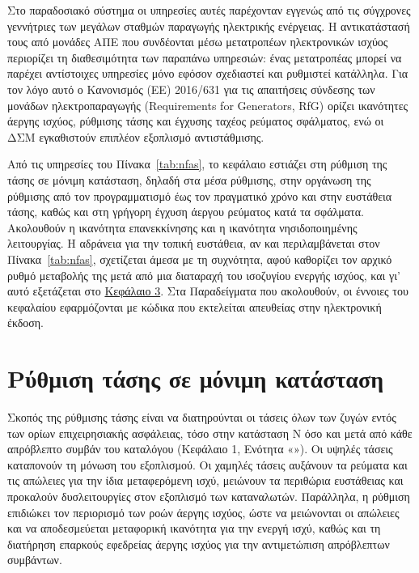 Στο παραδοσιακό σύστημα οι υπηρεσίες αυτές παρέχονταν εγγενώς από τις σύγχρονες γεννήτριες
των μεγάλων σταθμών παραγωγής ηλεκτρικής ενέργειας. Η αντικατάστασή τους από μονάδες ΑΠΕ που συνδέονται μέσω
μετατροπέων ηλεκτρονικών ισχύος περιορίζει τη διαθεσιμότητα των παραπάνω υπηρεσιών: ένας μετατροπέας μπορεί να παρέχει αντίστοιχες
υπηρεσίες μόνο εφόσον σχεδιαστεί και ρυθμιστεί κατάλληλα. Για τον λόγο αυτό ο Κανονισμός (ΕΕ) 2016/631 για τις απαιτήσεις σύνδεσης
των μονάδων ηλεκτροπαραγωγής (Requirements for Generators, RfG) ορίζει ικανότητες άεργης
ισχύος, ρύθμισης τάσης και έγχυσης ταχέος ρεύματος σφάλματος, ενώ οι ΔΣΜ εγκαθιστούν
επιπλέον εξοπλισμό αντιστάθμισης.

Από τις υπηρεσίες του Πίνακα~\ref{tab:nfas}, το κεφάλαιο εστιάζει στη ρύθμιση της τάσης σε
μόνιμη κατάσταση, δηλαδή στα μέσα ρύθμισης, στην οργάνωση της ρύθμισης από τον προγραμματισμό
έως τον πραγματικό χρόνο και στην ευστάθεια τάσης, καθώς και στη γρήγορη έγχυση άεργου ρεύματος
κατά τα σφάλματα. Ακολουθούν η ικανότητα επανεκκίνησης και η ικανότητα νησιδοποιημένης
λειτουργίας. Η
αδράνεια για την τοπική ευστάθεια, αν και περιλαμβάνεται στον Πίνακα~\ref{tab:nfas}, σχετίζεται
άμεσα με τη συχνότητα, αφού καθορίζει τον αρχικό ρυθμό μεταβολής της μετά από μια διαταραχή του
ισοζυγίου ενεργής ισχύος, και γι' αυτό εξετάζεται στο \hyperref[kef-03-theoria]{Κεφάλαιο 3}.
Στα Παραδείγματα που ακολουθούν, οι έννοιες του κεφαλαίου εφαρμόζονται με κώδικα που εκτελείται
απευθείας στην ηλεκτρονική έκδοση.

\section{Ρύθμιση τάσης σε μόνιμη κατάσταση}
\label{sec:v-control}

Σκοπός της ρύθμισης τάσης είναι να διατηρούνται οι τάσεις όλων των ζυγών εντός των ορίων
επιχειρησιακής ασφάλειας, τόσο στην κατάσταση N όσο και μετά από κάθε απρόβλεπτο συμβάν του
καταλόγου (Κεφάλαιο 1, Ενότητα «»). Οι υψηλές τάσεις καταπονούν τη μόνωση του
εξοπλισμού. Οι χαμηλές τάσεις αυξάνουν τα ρεύματα και τις απώλειες για την ίδια μεταφερόμενη
ισχύ, μειώνουν τα περιθώρια ευστάθειας και προκαλούν δυσλειτουργίες στον εξοπλισμό των
καταναλωτών. Παράλληλα, η ρύθμιση επιδιώκει τον περιορισμό των ροών άεργης ισχύος, ώστε να
μειώνονται οι απώλειες και να αποδεσμεύεται μεταφορική ικανότητα για την ενεργή ισχύ, καθώς
και τη διατήρηση επαρκούς εφεδρείας άεργης ισχύος για την αντιμετώπιση απρόβλεπτων
συμβάντων.

